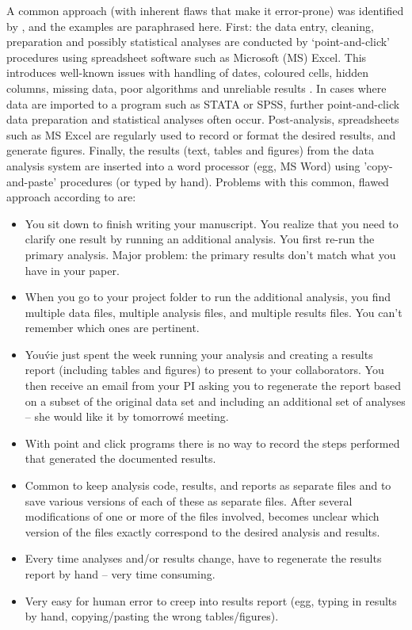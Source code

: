 \documentclass[11pt,a4paper]{article}
\begin{document}
A common approach (with inherent flaws that make it error-prone) was identified by \citet{Scott}, and the examples are paraphrased here.  
First: the data entry, cleaning, preparation and possibly statistical analyses are conducted by `point-and-click' procedures using spreadsheet software such as Microsoft (MS) Excel.
This introduces well-known issues with handling of dates, coloured cells, hidden columns, missing data, poor algorithms and unreliable results \citep{McCullough2008}.
In cases where data are imported to a program such as STATA or SPSS, further point-and-click data preparation and statistical analyses often occur.
Post-analysis, spreadsheets such as MS Excel are regularly used to record or format the desired results, and generate figures.
Finally, the results (text, tables and figures) from the data analysis system are inserted into a word processor (egg, MS Word) using 'copy-and-paste' procedures (or typed by hand). 
\clearpage
Problems with this common, flawed approach according to \citet{Scott} are:
\begin{itemize}
\item You sit down to finish writing your manuscript. You realize that you need to clarify one result by running an additional analysis. You first re-run the primary analysis. Major problem: the primary results don’t match what you have in your paper.
\item When you go to your project folder to run the additional analysis, you find multiple data files, multiple analysis files,
and multiple results files. You can’t remember which ones are pertinent.
\item You\'vie just spent the week running your analysis and creating a results report (including tables and figures) to present to your collaborators. You then receive an email from your PI asking you to regenerate the report based on a subset of the original data set and including an additional set of analyses – she would like it by tomorrow\'s meeting.
\item With point and click programs there is no way to record the steps performed that generated the documented results.
\item Common to keep analysis code, results, and reports as separate files and to save various versions of each of these as separate files.
After several modifications of one or more of the files involved, becomes unclear which version of the files exactly correspond to the desired analysis and results.
\item Every time analyses and/or results change, have to regenerate the results report by hand – very time consuming.
\item Very easy for human error to creep into results report (egg, typing in results by hand, copying/pasting the wrong tables/figures).
\end{itemize}
\end{document}
